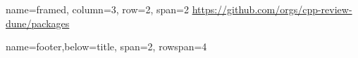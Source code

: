 \documentclass[
	paper=a0,%
	style=ruled, %
	]{bfhsciposter}
\newcommand{\tbs}{\textbackslash}
\let\code\texttt
\newcommand*{\macro}[1]{\code{\tbs#1}}
\begin{document}
\begin{tcbposter}[
		poster={
				columns=4,
				rows=7,
				spacing=1cm,
			},]
	\begin{posterboxenv}[title=C++ Review Dune meets Arch4edu, BFH-framed]{name=framed, column=3, row=2, span=2}
		\url{https://github.com/orgs/cpp-review-dune/packages}
	\end{posterboxenv}

	\begin{posterboxenv}[title=Tutorials running available on Gitpod]{name=footer,below=title, span=2, rowspan=4}





\end{posterboxenv}
\end{tcbposter}
\end{document}
